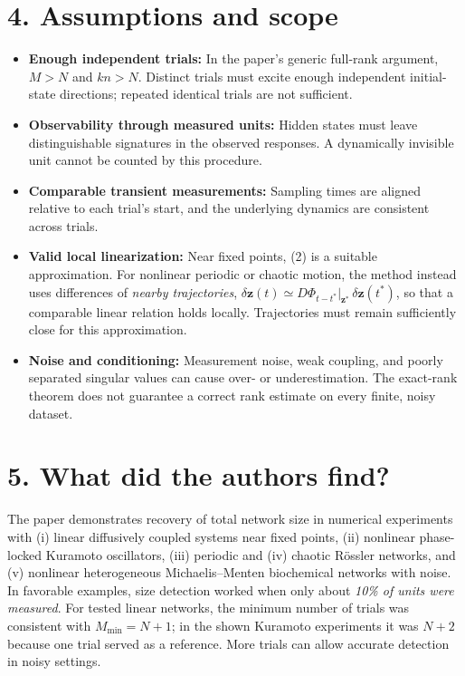 \documentclass[10pt,a4paper]{article}
\begin{document}
\section{4. Assumptions and scope}
\begin{itemize}
\item \textbf{Enough independent trials:} In the paper's generic full-rank argument, $M>N$ and $kn>N$. Distinct trials must excite enough independent initial-state directions; repeated identical trials are not sufficient.
\item \textbf{Observability through measured units:} Hidden states must leave distinguishable signatures in the observed responses. A dynamically invisible unit cannot be counted by this procedure.
\item \textbf{Comparable transient measurements:} Sampling times are aligned relative to each trial's start, and the underlying dynamics are consistent across trials.
\item \textbf{Valid local linearization:} Near fixed points, (2) is a suitable approximation. For nonlinear periodic or chaotic motion, the method instead uses differences of \emph{nearby trajectories}, $\delta\mathbf z(t)\simeq D\Phi_{t-t^*}|_{\mathbf z^*}\,\delta\mathbf z(t^*)$, so that a comparable linear relation holds locally. Trajectories must remain sufficiently close for this approximation.
\item \textbf{Noise and conditioning:} Measurement noise, weak coupling, and poorly separated singular values can cause over- or underestimation. The exact-rank theorem does not guarantee a correct rank estimate on every finite, noisy dataset.
\end{itemize}

\section{5. What did the authors find?}
The paper demonstrates recovery of total network size in numerical experiments with (i) linear diffusively coupled systems near fixed points, (ii) nonlinear phase-locked Kuramoto oscillators, (iii) periodic and (iv) chaotic R\"ossler networks, and (v) nonlinear heterogeneous Michaelis--Menten biochemical networks with noise. In favorable examples, size detection worked when only about \emph{10\% of units were measured}. For tested linear networks, the minimum number of trials was consistent with $M_{\min}=N+1$; in the shown Kuramoto experiments it was $N+2$ because one trial served as a reference. More trials can allow accurate detection in noisy settings.
\end{document}
